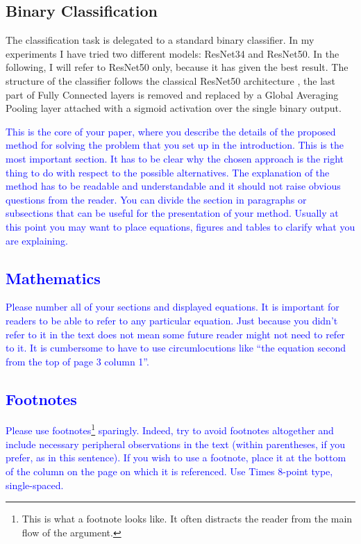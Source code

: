 \documentclass[10pt,twocolumn,letterpaper]{article}
\begin{document}
   \subsection{Binary Classification}
   The classification task is delegated to a standard binary classifier. In my experiments I have tried two different models: ResNet34 and ResNet50. In the following, I will refer to ResNet50 only, because it has given the best result.
   The structure of the classifier follows the classical ResNet50 architecture \cite{resnet}, the last part of Fully Connected layers is removed and replaced by a Global Averaging Pooling layer attached with a sigmoid activation over the single binary output.



\textcolor{blue}{
This is the core of your paper, where you describe the details of the proposed method for solving the problem that you set up in the introduction. This is the most important section. It has to be clear why the chosen approach is the right thing to do with respect to the possible alternatives. The explanation of the method has to be readable and understandable and it should not raise obvious questions from the reader. 
You can divide the section in paragraphs or subsections that can be useful for the presentation of your method. Usually at this point you may want to place equations, figures and tables to clarify what you are explaining.
\subsection{Mathematics}
Please number all of your sections and displayed equations.  It is
important for readers to be able to refer to any particular equation.  Just
because you didn't refer to it in the text does not mean some future reader
might not need to refer to it.  It is cumbersome to have to use
circumlocutions like ``the equation second from the top of page 3 column
1''. 
\subsection{Footnotes}
Please use footnotes\footnote {This is what a footnote looks like.  It
often distracts the reader from the main flow of the argument.} sparingly.
Indeed, try to avoid footnotes altogether and include necessary peripheral
observations in
the text (within parentheses, if you prefer, as in this sentence).  If you
wish to use a footnote, place it at the bottom of the column on the page on
which it is referenced. Use Times 8-point type, single-spaced.
}
\end{document}
